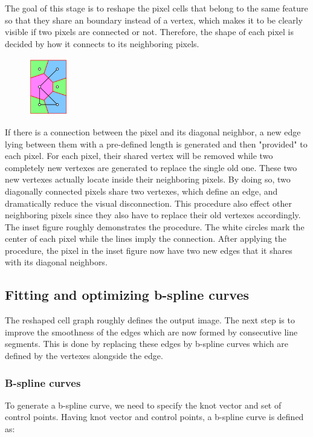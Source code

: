 \documentclass{article}
\begin{document}
The goal of this stage is to reshape the pixel cells that belong to the same feature so that they share an boundary instead of a vertex, which makes it to be clearly visible if two pixels are connected or not. Therefore, the shape of each pixel is decided by how it connects to its neighboring pixels.\begin{figure}
    \includegraphics[width=0.15\textwidth]{diagram}
\end{figure}
If there is a connection between the pixel and its diagonal neighbor, a new edge lying between them with a pre-defined length is generated and then "provided" to each pixel. For each pixel, their shared vertex will be removed while two completely new vertexes are generated to replace the single old one. These two new vertexes actually locate inside their neighboring pixels.
By doing so, two diagonally connected pixels share two vertexes, which define an edge, and dramatically reduce the visual disconnection.
This procedure also effect other neighboring pixels since they also have to replace their old vertexes accordingly. The inset figure roughly demonstrates the procedure. The white circles mark the center of each pixel while the lines imply the connection. After applying the procedure, the pixel in the inset figure now have two new edges that it shares with its diagonal neighbors. 

\subsection{Fitting and optimizing b-spline curves}

The reshaped cell graph roughly defines the output image. The next step is to improve the smoothness of the edges which are now formed by consecutive line segments. This is done by replacing these edges by b-spline curves which are defined by the vertexes alongside the edge. 

\subsubsection{B-spline curves}

To generate a b-spline curve, we need to specify the knot vector and set of control points. Having knot vector and control points, a b-spline curve is defined as:
\end{document}
